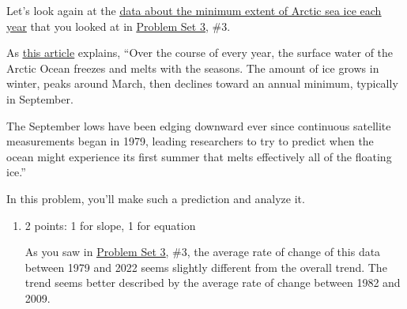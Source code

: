 \documentclass{article}
\makeatletter
\let\@href=\href
\renewcommand{\href}[2]{\@href{#1}{\ul{#2}}}
\makeatother
\begin{document}
\begin{enumerate}
  Let's look again at the \href{https://docs.google.com/spreadsheets/d/1Dx8q2itdxCfEfRMkhUi4188zXYFqXQ2MB1_svnefxyg/edit?usp=sharing}{data about the minimum extent of Arctic sea ice each year} that you looked at in \href{https://people.math.harvard.edu/~jjchen/mathma/docs/homework/PS03.html}{Problem Set 3}, {{\#3}}.

  As \href{https://www.nytimes.com/2023/06/06/climate/arctic-sea-ice-melting.html?unlocked_article_code=nXmJIxuK12SggHXtdz1IzZl-3aIKMrP2_qQdzvd2CbevbDh1odkuddWyowZS3pTgW-_GmxLi2Nxp5ylAqIkR7VyX6xbwWAmCeBxGE2HQoMxLFGgiAyp1KxTD4o9LADYpsRocZ-3b628uflHlv-0gBIH3BSosQ92jEYKffLkb3MDlWYPbTtz12Vga4E8Qa7tuOsOJLXDCX3Tmpf3t4sDFCQeYe_POpT1Jp2Rxp4_6vTxtK6jFqh81-b-vYCNCGszjQGAyXwtaxtA2qjjss-W-wf-JC4cOzSlJSJ4IOIK593Cq0acrpxz9D_WiIkBchdBdG6tEiMsJw2OjxcRv1-KDcw&smid=url-share}{this article} explains, ``Over the course of every year, the surface water of the Arctic Ocean freezes and melts with the seasons. The amount of ice grows in winter, peaks around March, then declines toward an annual minimum, typically in September.

  The September lows have been edging downward ever since continuous satellite measurements began in 1979, leading researchers to try to predict when the ocean might experience its first summer that melts effectively all of the floating ice.''

  In this problem, you'll make such a prediction and analyze it.

  \begin{enumerate}
  \item

    \begin{grading}
      2 points: 1 for slope, 1 for equation
    \end{grading}

    \begin{problem}[\vfill]
      As you saw in \href{https://people.math.harvard.edu/~jjchen/mathma/docs/homework/PS03.html}{Problem Set 3}, {{\#3}}, the average rate of change of this data between 1979 and 2022 seems slightly different from the overall trend. The trend seems better described by the average rate of change between 1982 and 2009.


\end{problem}
\end{enumerate}
\end{enumerate}
\end{document}

